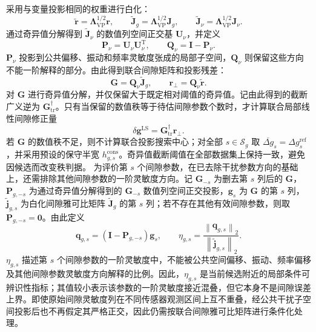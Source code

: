 \documentclass[UTF8,12pt,a4paper]{ctexart}
\begin{document}
采用与变量投影相同的权重进行白化：
\begin{equation}
\widetilde{\bm r}=\bm\Lambda_{\mathrm{VP}}^{1/2}\bm r,
\qquad
\widetilde{\bm J}_{g}=\bm\Lambda_{\mathrm{VP}}^{1/2}\bm J_g,
\qquad
\widetilde{\bm J}_{\nu}=\bm\Lambda_{\mathrm{VP}}^{1/2}\bm J_{\nu}.
\label{eq:gap_whitening}
\end{equation}
通过奇异值分解得到 $\widetilde{\bm J}_{\nu}$ 的数值列空间正交基 $\bm U_{\nu}$，并定义
\begin{equation}
\bm P_{\nu}=\bm U_{\nu}\bm U_{\nu}^{\mathrm T},
\qquad
\bm Q_{\nu}=\bm I-\bm P_{\nu}.
\label{eq:projector}
\end{equation}
$\bm P_{\nu}$ 投影到公共偏移、振动和频率灵敏度张成的局部子空间，$\bm Q_{\nu}$ 则保留这些方向不能一阶解释的部分。由此得到联合间隙矩阵和投影残差：
\begin{equation}
\bm G=\bm Q_{\nu}\widetilde{\bm J}_g,
\qquad
\bm r_{\perp}=\bm Q_{\nu}\widetilde{\bm r}.
\label{eq:projected_gap_system}
\end{equation}
对 $\bm G$ 进行奇异值分解，并仅保留大于既定相对阈值的奇异值。记由此得到的截断广义逆为 $\bm G_{\mathrm{tr}}^{\dagger}$。只有当保留的数值秩等于待估间隙参数个数时，才计算联合局部线性间隙修正量
\begin{equation}
\delta\bm g^{\mathrm{LS}}
=\bm G_{\mathrm{tr}}^{\dagger}\bm r_{\perp}.
\label{eq:joint_gap_ls}
\end{equation}
若 $\bm G$ 的数值秩不足，则不计算联合投影搜索中心；对全部 $s\in\mathcal S_g$ 取 $\overline{\Delta g}_s=\Delta g_s^{\mathrm{ref}}$，并采用预设的保守半宽 $h_{g,s}^{\mathrm{cons}}$。奇异值截断阈值在全部数据集上保持一致，避免因候选而改变秩判据。
为评价第 $s$ 个间隙参数，在已去除干扰参数方向的基础上，还需排除其他间隙参数的一阶灵敏度方向。记 $\bm G_{-s}$ 为删去第 $s$ 列后的 $\bm G$，$\bm P_{g,-s}$ 为通过奇异值分解得到的 $\bm G_{-s}$ 数值列空间正交投影，$\bm g_s$ 为 $\bm G$ 的第 $s$ 列，$\widetilde{\bm j}_{g,s}$ 为白化间隙雅可比矩阵 $\widetilde{\bm J}_g$ 的第 $s$ 列；若不存在其他有效间隙参数，则取 $\bm P_{g,-s}=\bm0$。由此定义
\begin{equation}
\bm q_{g,s}=
\left(\bm I-\bm P_{g,-s}\right)\bm g_s,
\qquad
\eta_{g,s}=
\frac{\left\lVert\bm q_{g,s}\right\rVert_2}
{\left\lVert\widetilde{\bm j}_{g,s}\right\rVert_2}.
\label{eq:gap_separability}
\end{equation}
$\eta_{g,s}$ 描述第 $s$ 个间隙参数的一阶灵敏度中，不能被公共空间偏移、振动、频率偏移及其他间隙参数灵敏度方向解释的比例。因此，$\eta_{g,s}$ 是当前候选附近的局部条件可辨识性指标；其值较小表示该参数的一阶灵敏度接近混叠，但它本身不是间隙误差上界。即使原始间隙灵敏度列在不同传感器观测区间上互不重叠，经公共干扰子空间投影后也不再假定其严格正交，因此仍需按联合间隙雅可比矩阵进行条件化处理。
\end{document}

